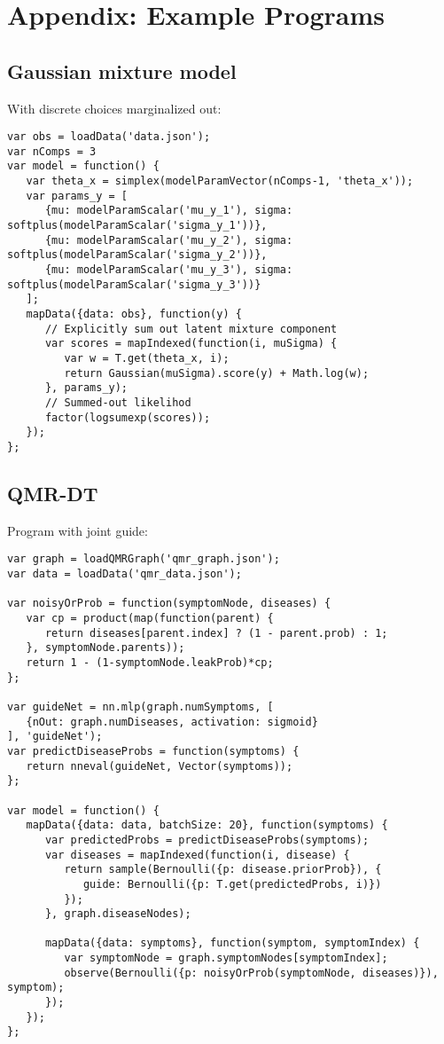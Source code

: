 \section{Appendix: Example Programs}
\label{sec:appendix_code}

\subsection{Gaussian mixture model}
\label{sec:appendix_code:gmmSumOut}

With discrete choices marginalized out:
\begin{lstlisting}
var obs = loadData('data.json');
var nComps = 3
var model = function() {
   var theta_x = simplex(modelParamVector(nComps-1, 'theta_x'));
   var params_y = [
      {mu: modelParamScalar('mu_y_1'), sigma: softplus(modelParamScalar('sigma_y_1'))},
      {mu: modelParamScalar('mu_y_2'), sigma: softplus(modelParamScalar('sigma_y_2'))},
      {mu: modelParamScalar('mu_y_3'), sigma: softplus(modelParamScalar('sigma_y_3'))}
   ];
   mapData({data: obs}, function(y) {
      // Explicitly sum out latent mixture component
      var scores = mapIndexed(function(i, muSigma) {
         var w = T.get(theta_x, i);
         return Gaussian(muSigma).score(y) + Math.log(w);
      }, params_y);
      // Summed-out likelihod
      factor(logsumexp(scores));
   });
};
\end{lstlisting}

\subsection{QMR-DT}
\label{sec:appendix_code:qmr}

Program with joint guide:
\begin{lstlisting}
var graph = loadQMRGraph('qmr_graph.json');
var data = loadData('qmr_data.json');

var noisyOrProb = function(symptomNode, diseases) {
   var cp = product(map(function(parent) {
      return diseases[parent.index] ? (1 - parent.prob) : 1;
   }, symptomNode.parents));
   return 1 - (1-symptomNode.leakProb)*cp;
};

var guideNet = nn.mlp(graph.numSymptoms, [
   {nOut: graph.numDiseases, activation: sigmoid}
], 'guideNet');
var predictDiseaseProbs = function(symptoms) {
   return nneval(guideNet, Vector(symptoms));
};

var model = function() {
   mapData({data: data, batchSize: 20}, function(symptoms) {
      var predictedProbs = predictDiseaseProbs(symptoms);
      var diseases = mapIndexed(function(i, disease) {
         return sample(Bernoulli({p: disease.priorProb}), {
            guide: Bernoulli({p: T.get(predictedProbs, i)})
         });
      }, graph.diseaseNodes);

      mapData({data: symptoms}, function(symptom, symptomIndex) {
         var symptomNode = graph.symptomNodes[symptomIndex];
         observe(Bernoulli({p: noisyOrProb(symptomNode, diseases)}), symptom);
      });
   });
};
\end{lstlisting}

